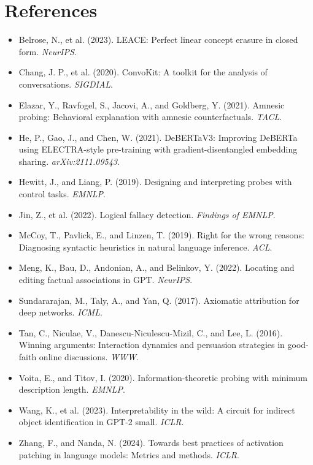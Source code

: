 \documentclass[11pt,a4paper]{article}
\begin{document}
\section*{References}
\small
\begin{itemize}[leftmargin=*, label={}, itemsep=1pt]
\item Belrose, N., et al. (2023). LEACE: Perfect linear concept erasure in closed form. \emph{NeurIPS}.
\item Chang, J. P., et al. (2020). ConvoKit: A toolkit for the analysis of conversations. \emph{SIGDIAL}.
\item Elazar, Y., Ravfogel, S., Jacovi, A., and Goldberg, Y. (2021). Amnesic probing: Behavioral explanation with amnesic counterfactuals. \emph{TACL}.
\item He, P., Gao, J., and Chen, W. (2021). DeBERTaV3: Improving DeBERTa using ELECTRA-style pre-training with gradient-disentangled embedding sharing. \emph{arXiv:2111.09543}.
\item Hewitt, J., and Liang, P. (2019). Designing and interpreting probes with control tasks. \emph{EMNLP}.
\item Jin, Z., et al. (2022). Logical fallacy detection. \emph{Findings of EMNLP}.
\item McCoy, T., Pavlick, E., and Linzen, T. (2019). Right for the wrong reasons: Diagnosing syntactic heuristics in natural language inference. \emph{ACL}.
\item Meng, K., Bau, D., Andonian, A., and Belinkov, Y. (2022). Locating and editing factual associations in GPT. \emph{NeurIPS}.
\item Sundararajan, M., Taly, A., and Yan, Q. (2017). Axiomatic attribution for deep networks. \emph{ICML}.
\item Tan, C., Niculae, V., Danescu-Niculescu-Mizil, C., and Lee, L. (2016). Winning arguments: Interaction dynamics and persuasion strategies in good-faith online discussions. \emph{WWW}.
\item Voita, E., and Titov, I. (2020). Information-theoretic probing with minimum description length. \emph{EMNLP}.
\item Wang, K., et al. (2023). Interpretability in the wild: A circuit for indirect object identification in GPT-2 small. \emph{ICLR}.
\item Zhang, F., and Nanda, N. (2024). Towards best practices of activation patching in language models: Metrics and methods. \emph{ICLR}.
\end{itemize}
\end{document}
